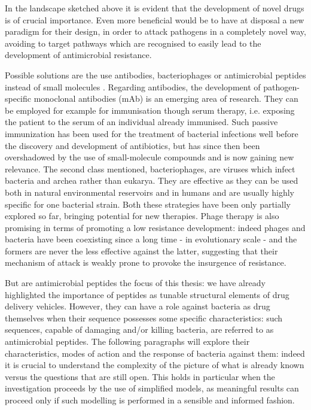 In the landscape sketched above it is evident that the development of novel drugs is of crucial importance. Even more beneficial would be to have at disposal a new paradigm for their design, in order to attack pathogens in a completely novel way, avoiding to target pathways which are recognised to easily lead to the development of antimicrobial resistance.

Possible solutions are the use antibodies, bacteriophages or antimicrobial peptides instead of small molecules \cite{Mantravadi2019}.
%
Regarding antibodies, the development of pathogen-specific monoclonal antibodies (mAb) is an emerging area of research. They can be employed for example for immunisation though serum therapy, i.e. exposing the patient to the serum of an individual already immunised. Such passive immunization has been used for the treatment of bacterial infections well before the discovery and development of antibiotics, but has since then been overshadowed by the use of small-molecule compounds and is now gaining new relevance.
%
The second class mentioned, bacteriophages, are viruses which infect bacteria and archea rather than eukarya. They are effective as they can be used both in natural environmental reservoirs and in humans and are usually highly specific for one bacterial strain.
%
Both these strategies have been only partially explored so far, bringing potential for new therapies. Phage therapy is also promising in terms of promoting a low resistance development: indeed phages and bacteria have been coexisting since a long time - in evolutionary scale - and the formers are never the less effective against the latter, suggesting that their mechanism of attack is weakly prone to provoke the insurgence of resistance.

But are antimicrobial peptides the focus of this thesis: we have already highlighted the importance of peptides as tunable structural elements of drug delivery vehicles. However, they can have a role against bacteria as drug themselves when their sequence possesses some specific characteristics: such sequences, capable of damaging and/or killing bacteria, are referred to as antimicrobial peptides. The following paragraphs will explore their characteristics, modes of action and the response of bacteria against them: indeed it is crucial to understand the complexity of the picture of what is already known versus the questions that are still open. This holds in particular when the investigation proceeds by the use of simplified models, as meaningful results can proceed only if such modelling is performed in a sensible and informed fashion.

